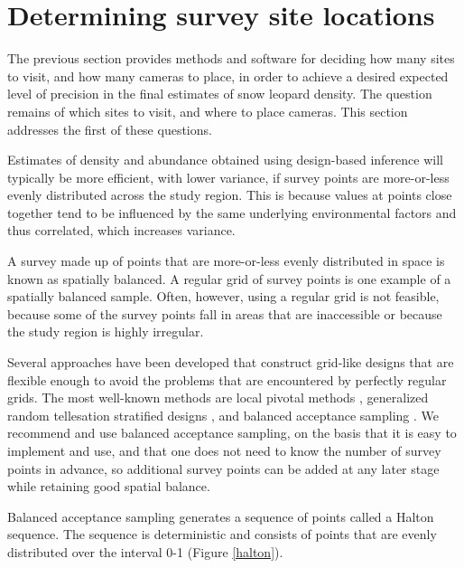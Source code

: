 \documentclass[a4paper,11pt, draft]{article} %
\begin{document}
\section{Determining survey site locations} \label{s:halton}

The previous section provides methods and software for deciding how many sites to visit, and how many cameras to place, in order to achieve a desired expected level of precision in the final estimates of snow leopard density. The question remains of which sites to visit, and where to place cameras. This section addresses the first of these questions.

Estimates of density and abundance obtained using design-based inference will typically be more efficient, with lower variance, if survey points are more-or-less evenly distributed across the study region. This is because values at points close together tend to be influenced by the same underlying environmental factors and thus correlated, which increases variance. 

A survey made up of points that are more-or-less evenly distributed in space is known as spatially balanced. A regular grid of survey points is one example of a spatially balanced sample. Often, however, using a regular grid is not feasible, because some of the survey points fall in areas that are inaccessible or because the study region is highly irregular. 

Several approaches have been developed that construct grid-like designs that are flexible enough to avoid the problems that are encountered by perfectly regular grids. The most well-known methods are local pivotal methods \citep{Grafstrom2012}, generalized random tellesation stratified designs \citep{Stevens2004}, and balanced acceptance sampling \citep{Robertson2013,Vandambates2018}. We recommend and use balanced acceptance sampling, on the basis that it is easy to implement and use, and that one does not need to know the number of survey points in advance, so additional survey points can be added at any later stage while retaining good spatial balance.

Balanced acceptance sampling generates a sequence of points called a Halton sequence. The sequence is deterministic and consists of points that are evenly distributed over the interval 0-1 (Figure \ref{halton}). 
\end{document}
